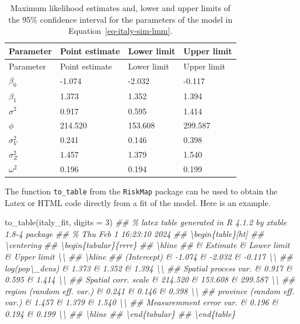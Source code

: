 \documentclass[
  letterpaper,
]{krantz}
\newenvironment{Shaded}{\begin{snugshade}}{\end{snugshade}}
\newcommand{\AttributeTok}[1]{\textcolor[rgb]{0.40,0.45,0.13}{#1}}
\newcommand{\DecValTok}[1]{\textcolor[rgb]{0.68,0.00,0.00}{#1}}
\newcommand{\DocumentationTok}[1]{\textcolor[rgb]{0.37,0.37,0.37}{\textit{#1}}}
\newcommand{\FunctionTok}[1]{\textcolor[rgb]{0.28,0.35,0.67}{#1}}
\newcommand{\NormalTok}[1]{\textcolor[rgb]{0.00,0.23,0.31}{#1}}
\begin{document}
\hypertarget{tbl-italy-sim-mle}{}
\begin{longtable}[]{@{}llll@{}}
\caption{\label{tbl-italy-sim-mle}Maximum likelihood estimates and,
lower and upper limits of the 95\% confidence interval for the
parameters of the model in
Equation~\ref{eq-italy-sim-lmm}.}\tabularnewline
\toprule\noalign{}
Parameter & Point estimate & Lower limit & Upper limit \\
\midrule\noalign{}
\endfirsthead
\toprule\noalign{}
Parameter & Point estimate & Lower limit & Upper limit \\
\midrule\noalign{}
\endhead
\bottomrule\noalign{}
\endlastfoot
\(\beta_0\) & -1.074 & -2.032 & -0.117 \\
\(\beta_1\) & 1.373 & 1.352 & 1.394 \\
\(\sigma^2\) & 0.917 & 0.595 & 1.414 \\
\(\phi\) & 214.520 & 153.608 & 299.587 \\
\(\sigma^2_{V}\) & 0.241 & 0.146 & 0.398 \\
\(\sigma^2_{Z}\) & 1.457 & 1.379 & 1.540 \\
\(\omega^2\) & 0.196 & 0.194 & 0.199 \\
\end{longtable}

The function \texttt{to\_table} from the \texttt{RiskMap} package can be
used to obtain the Latex or HTML code directly from a fit of the model.
Here is an example.

\begin{Shaded}
\begin{Highlighting}[]
\FunctionTok{to\_table}\NormalTok{(italy\_fit, }\AttributeTok{digits =} \DecValTok{3}\NormalTok{)}
\DocumentationTok{\#\# \% latex table generated in R 4.1.2 by xtable 1.8{-}4 package}
\DocumentationTok{\#\# \% Thu Feb  1 16:23:10 2024}
\DocumentationTok{\#\# \textbackslash{}begin\{table\}[ht]}
\DocumentationTok{\#\# \textbackslash{}centering}
\DocumentationTok{\#\# \textbackslash{}begin\{tabular\}\{rrrr\}}
\DocumentationTok{\#\#   \textbackslash{}hline}
\DocumentationTok{\#\#  \& Estimate \& Lower limit \& Upper limit \textbackslash{}\textbackslash{} }
\DocumentationTok{\#\#   \textbackslash{}hline}
\DocumentationTok{\#\# (Intercept) \& {-}1.074 \& {-}2.032 \& {-}0.117 \textbackslash{}\textbackslash{} }
\DocumentationTok{\#\#   log(pop\textbackslash{}\_dens) \& 1.373 \& 1.352 \& 1.394 \textbackslash{}\textbackslash{} }
\DocumentationTok{\#\#   Spatial process var. \& 0.917 \& 0.595 \& 1.414 \textbackslash{}\textbackslash{} }
\DocumentationTok{\#\#   Spatial corr. scale \& 214.520 \& 153.608 \& 299.587 \textbackslash{}\textbackslash{} }
\DocumentationTok{\#\#   region (random eff. var.) \& 0.241 \& 0.146 \& 0.398 \textbackslash{}\textbackslash{} }
\DocumentationTok{\#\#   province (random eff. var.) \& 1.457 \& 1.379 \& 1.540 \textbackslash{}\textbackslash{} }
\DocumentationTok{\#\#   Measuremment error var. \& 0.196 \& 0.194 \& 0.199 \textbackslash{}\textbackslash{} }
\DocumentationTok{\#\#    \textbackslash{}hline}
\DocumentationTok{\#\# \textbackslash{}end\{tabular\}}
\DocumentationTok{\#\# \textbackslash{}end\{table\}}
\end{Highlighting}
\end{Shaded}
\end{document}
